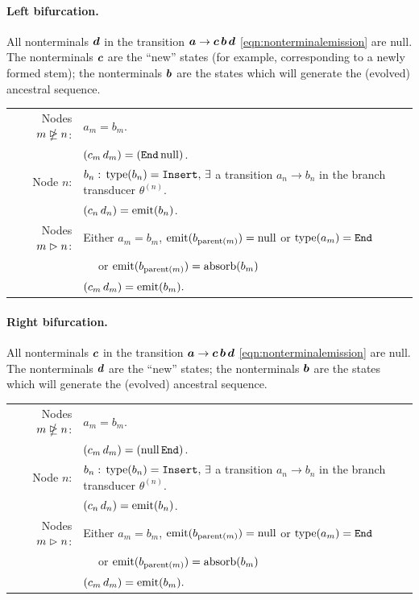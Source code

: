 \documentclass[10pt]{article}
\begin{document}
\paragraph{Left bifurcation.}
All nonterminals $\boldsymbol{d}$ in the transition $\boldsymbol{a} \to \boldsymbol{c}\,\boldsymbol{b}\,\boldsymbol{d}$ \eqref{eqn:nonterminalemission} are null.
The nonterminals $\boldsymbol{c}$ are the ``new'' states (for example, corresponding to a newly formed stem);
the nonterminals $\boldsymbol{b}$ are the states which will generate the (evolved) ancestral sequence.

\begin{tabular}{rl}
  Nodes $m \ntrianglerighteq n$: & $a_m = b_m$. \\
  & $(c_m\,d_m) = (\mathtt{End}\,\mathrm{null})$. \\
  Node $n$: & $b_n:\,\operatorname{type}(b_n) = \mathtt{Insert},\,\exists$ a transition $a_n \to b_n$ in the branch transducer $\theta^{(n)}$. \\
  & $(c_n\,d_n) = \operatorname{emit}(b_n)$. \\
  Nodes $m \vartriangleright n$: & Either $a_m = b_m$, $\operatorname{emit}(b_{\operatorname{parent}(m)}) = \mathrm{null}$ or $\operatorname{type}(a_m) = \mathtt{End}$ \\
  & $\quad$ or $\operatorname{emit}(b_{\operatorname{parent}(m)}) = \operatorname{absorb}(b_m)$ \\
  & $(c_m\,d_m) = \operatorname{emit}(b_m) . $
\end{tabular}


\paragraph{Right bifurcation.}
All nonterminals $\boldsymbol{c}$ in the transition $\boldsymbol{a} \to \boldsymbol{c}\,\boldsymbol{b}\,\boldsymbol{d}$ \eqref{eqn:nonterminalemission} are null.
The nonterminals $\boldsymbol{d}$ are the ``new'' states;
the nonterminals $\boldsymbol{b}$ are the states which will generate the (evolved) ancestral sequence.

\begin{tabular}{rl}
  Nodes $m \ntrianglerighteq n$: & $a_m = b_m$. \\
  & $(c_m\,d_m) = (\mathrm{null}\,\mathtt{End})$. \\
  Node $n$: & $b_n:\,\operatorname{type}(b_n) = \mathtt{Insert},\,\exists$ a transition $a_n \to b_n$ in the branch transducer $\theta^{(n)}$. \\
  & $(c_n\,d_n) = \operatorname{emit}(b_n)$. \\
  Nodes $m \vartriangleright n$: & Either $a_m = b_m$, $\operatorname{emit}(b_{\operatorname{parent}(m)}) = \mathrm{null}$ or $\operatorname{type}(a_m) = \mathtt{End}$ \\
  & $\quad$ or $\operatorname{emit}(b_{\operatorname{parent}(m)}) = \operatorname{absorb}(b_m)$ \\
  & $(c_m\,d_m) = \operatorname{emit}(b_m) . $
\end{tabular}
\end{document}
